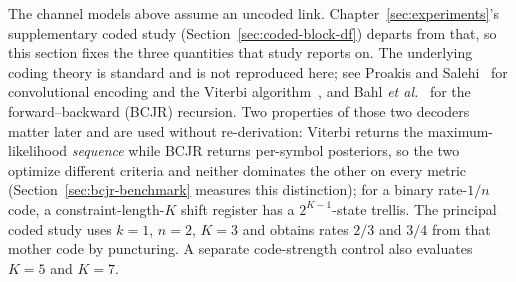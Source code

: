 The channel models above assume an uncoded link. Chapter~\ref{sec:experiments}'s supplementary coded study
(Section~\ref{sec:coded-block-df}) departs from that, so this section fixes the three quantities that study
reports on. The underlying coding theory is standard and is not reproduced here; see Proakis and
Salehi~\cite{ProakisSalehi2008DigitalComm} for convolutional encoding and the Viterbi
algorithm~\cite{Forney1972MLSE}, and Bahl \emph{et al.}~\cite{BahlCockeJelinekRaviv1974BCJR} for the
forward--backward (BCJR) recursion. Two properties of those two decoders matter later and are used without
re-derivation: Viterbi returns the maximum-likelihood \emph{sequence} while BCJR returns per-symbol
posteriors, so the two optimize different criteria and neither dominates the other on every metric
(Section~\ref{sec:bcjr-benchmark} measures this distinction); for a binary rate-$1/n$ code, a constraint-length-$K$
shift register has a $2^{K-1}$-state trellis. The principal coded study uses $k=1$, $n=2$, $K=3$ and obtains
rates $2/3$ and $3/4$ from that mother code by puncturing. A separate code-strength control also evaluates $K=5$ and $K=7$.

